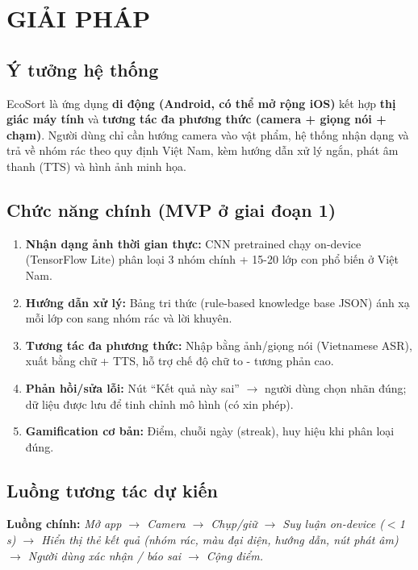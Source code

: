 \documentclass[13pt,a4paper,oneside]{report}
\begin{document}
\chapter{GIẢI PHÁP}

\section{Ý tưởng hệ thống}

EcoSort là ứng dụng \textbf{di động (Android, có thể mở rộng iOS)} kết hợp \textbf{thị giác máy tính} và \textbf{tương tác đa phương thức (camera + giọng nói + chạm)}. Người dùng chỉ cần hướng camera vào vật phẩm, hệ thống nhận dạng và trả về nhóm rác theo quy định Việt Nam, kèm hướng dẫn xử lý ngắn, phát âm thanh (TTS) và hình ảnh minh họa.

\section{Chức năng chính (MVP ở giai đoạn 1)}

\begin{enumerate}[label=\textbf{F\arabic*.}, leftmargin=1.5cm]
    \item \textbf{Nhận dạng ảnh thời gian thực:} CNN pretrained chạy on-device (TensorFlow Lite) phân loại 3 nhóm chính + 15-20 lớp con phổ biến ở Việt Nam.
    \item \textbf{Hướng dẫn xử lý:} Bảng tri thức (rule-based knowledge base JSON) ánh xạ mỗi lớp con sang nhóm rác và lời khuyên.
    \item \textbf{Tương tác đa phương thức:} Nhập bằng ảnh/giọng nói (Vietnamese ASR), xuất bằng chữ + TTS, hỗ trợ chế độ chữ to - tương phản cao.
    \item \textbf{Phản hồi/sửa lỗi:} Nút ``Kết quả này sai'' $\rightarrow$ người dùng chọn nhãn đúng; dữ liệu được lưu để tinh chỉnh mô hình (có xin phép).
    \item \textbf{Gamification cơ bản:} Điểm, chuỗi ngày (streak), huy hiệu khi phân loại đúng.
\end{enumerate}

\section{Luồng tương tác dự kiến}

\textbf{Luồng chính:} \textit{Mở app $\rightarrow$ Camera $\rightarrow$ Chụp/giữ $\rightarrow$ Suy luận on-device ($<$1 s) $\rightarrow$ Hiển thị thẻ kết quả (nhóm rác, màu đại diện, hướng dẫn, nút phát âm) $\rightarrow$ Người dùng xác nhận / báo sai $\rightarrow$ Cộng điểm.}
\end{document}
